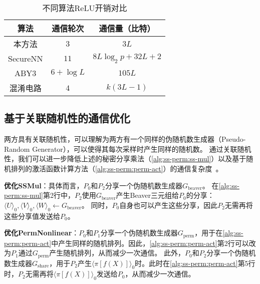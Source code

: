 \begin{table}[t]
    \caption{不同算法ReLU开销对比}
    \label{tab:ss-perm:relu}
    \centering
    \begin{tabular}{ccc}
    \toprule
    算法 & 通信轮次 & 通信量（比特） \\ 
    \midrule
    本方法 & $3$ & $3L$ \\
    SecureNN\cite{wagh2019securenn} & $11$ & $8L\log_2 p + 32L + 2$ \\
    ABY3\cite{mohassel2018aby3} & $6 + \log L$ & $105L$ \\
    混淆电路\cite{rouhani2018deepsecure} & $4$ & $k(3L - 1)$ \\
    \bottomrule
    \end{tabular}
\end{table}

\subsection{基于关联随机性的通信优化}
两方具有关联随机性，可以理解为两方有一个同样的伪随机数生成器（Pseudo-Random Generator），可以使得其每次采样时产生同样的随机数。
%
通过关联随机性，我们可以进一步降低上述的秘密分享乘法（\autoref{alg:ss-perm:ss-mul}）以及基于随机排列的激活函数计算方法（\autoref{alg:ss-perm:perm-act}）的通信复杂度~\cite{riazi_2018_chameleon}。
%

\textbf{优化\textsf{SSMul}}：具体而言，$P_0$和$P_2$分享一个伪随机数生成器$G_\text{beaver}$。
在\autoref{alg:ss-perm:ss-mul}第2行中，$P_2$使用$G_\text{beaver}$产生Beaver三元组给$P_0$的分享：$\langle U \rangle_0, \langle V \rangle_0, \langle W \rangle_0 \gets G_\text{beaver}$。
同时，$P_0$自身也可以产生这些分享，因此$P_2$无需再将这些分享值发送给$P_0$。


\textbf{优化\textsf{PermNonlinear}}：$P_0$和$P_1$分享一个伪随机数生成器$G_\text{perm}$，用于在\autoref{alg:ss-perm:perm-act}中产生同样的随机排列。因此，\autoref{alg:ss-perm:perm-act}第2行可以改为$P_1$通过$G_\text{perm}$产生随机排列，从而减少一次通信。
%
此外，$P_0$和$P_2$分享一个伪随机数生成器$G_\text{share}$，用于$P_2$产生$\langle \pi[f(X)] \rangle_0$时。此时在\autoref{alg:ss-perm:perm-act}第5行时，$P_2$无需再将$\langle \pi[f(X)] \rangle_0$发送给$P_0$，从而减少一次通信。


